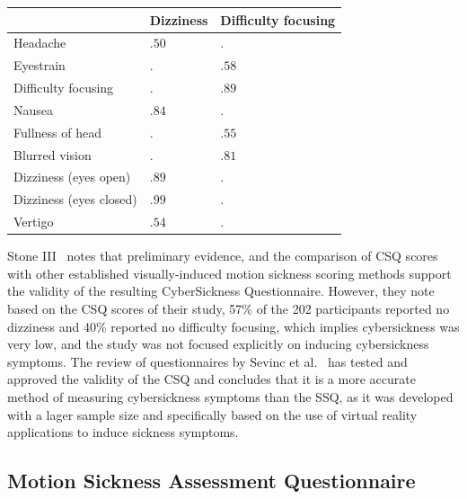 \begin{center}
    \begin{tabular}{ l l l}
        \toprule
        \textbf{} & \textbf{Dizziness} & \textbf{Difficulty focusing} \\
        \midrule
        Headache                & $.50$ & $.$   \\
        Eyestrain               & $.$   & $.58$ \\
        Difficulty focusing     & $.$   & $.89$ \\
        Nausea                  & $.84$ & $.$   \\
        Fullness of head        & $.$   & $.55$ \\
        Blurred vision          & $.$   & $.81$ \\
        Dizziness (eyes open)   & $.89$ & $.$   \\
        Dizziness (eyes closed) & $.99$ & $.$   \\
        Vertigo                 & $.54$ & $.$   \\
        \bottomrule
    \end{tabular}
    \label{tab:csq-scoring}
\end{center}
Stone III~\cite{Stone2017} notes that preliminary evidence, and the comparison of CSQ scores with other established
visually-induced motion sickness scoring methods support the validity of the resulting CyberSickness Questionnaire.
However, they note based on the CSQ scores of their study, 57\% of the 202 participants reported no dizziness and 40\%
reported no difficulty focusing, which implies cybersickness was very low, and the study was not focused
explicitly on inducing cybersickness symptoms.
The review of questionnaires by Sevinc et al.~\cite{Sevinc2020} has tested and approved the validity of the CSQ and
concludes that it is a more accurate method of measuring cybersickness symptoms than the SSQ, as it was developed
with a lager sample size and specifically based on the use of virtual reality applications to induce sickness symptoms.

\subsection{Motion Sickness Assessment Questionnaire}\label{subsec:motion-sickness-assessment-questionnaire}

